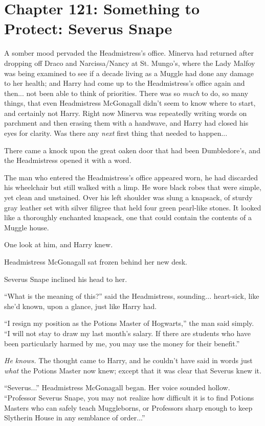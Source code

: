 \chapter{Chapter 121: Something to Protect: Severus Snape}
A somber mood pervaded the Headmistress's office. Minerva had returned after dropping off Draco and Narcissa/Nancy at St. Mungo's, where the Lady Malfoy was being examined to see if a decade living as a Muggle had done any damage to her health; and Harry had come up to the Headmistress's office again and then... not been able to think of priorities. There was so \emph{much} to do, so many things, that even Headmistress McGonagall didn't seem to know where to start, and certainly not Harry. Right now Minerva was repeatedly writing words on parchment and then erasing them with a handwave, and Harry had closed his eyes for clarity. Was there any \emph{next} first thing that needed to happen...

There came a knock upon the great oaken door that had been Dumbledore's, and the Headmistress opened it with a word.

The man who entered the Headmistress's office appeared worn, he had discarded his wheelchair but still walked with a limp. He wore black robes that were simple, yet clean and unstained. Over his left shoulder was slung a knapsack, of sturdy gray leather set with silver filigree that held four green pearl-like stones. It looked like a thoroughly enchanted knapsack, one that could contain the contents of a Muggle house.

One look at him, and Harry knew.

Headmistress McGonagall sat frozen behind her new desk.

Severus Snape inclined his head to her.

``What is the meaning of this?'' said the Headmistress, sounding... heart-sick, like she'd known, upon a glance, just like Harry had.

``I resign my position as the Potions Master of Hogwarts,'' the man said simply. ``I will not stay to draw my last month's salary. If there are students who have been particularly harmed by me, you may use the money for their benefit.''

\emph{He knows.} The thought came to Harry, and he couldn't have said in words just \emph{what} the Potions Master now knew; except that it was clear that Severus knew it.

``Severus...'' Headmistress McGonagall began. Her voice sounded hollow. ``Professor Severus Snape, you may not realize how difficult it is to find Potions Masters who can safely teach Muggleborns, or Professors sharp enough to keep Slytherin House in any semblance of order...''

